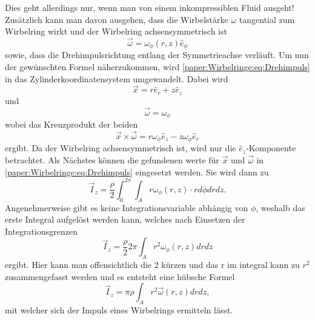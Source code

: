 Dies geht allerdings nur, wenn man von einem inkompressiblen Fluid ausgeht!
Zusätzlich kann man davon ausgehen, dass die Wirbelstärke $\omega$ tangential zum Wirbelring wirkt und der Wirbelring achsensymmetrisch ist
\begin{equation*}
    \vec{\omega}
    =
    \omega_\phi(r,z)\hat{e}_\phi
\end{equation*}
sowie, dass die Drehimpulsrichtung entlang der Symmetrieachse verläuft.
Um nun der gewünschten Formel näherzukommen, wird \ref{paper:Wirbelringe:eq:Drehimpuls} in das Zylinderkoordinatensystem umgewandelt.
Dabei wird
\begin{equation*}
    \vec{x}
    =
    r\hat{e}_r + z\hat{e}_z
\end{equation*}
und
\begin{equation*}
    \vec{\omega}
    =
    \omega_\phi
\end{equation*}
wobei das Kreuzprodukt der beiden 
\begin{equation*}
    \vec{x}\times\vec{\omega}
    =
    r\omega_\phi\hat{e}_z - z\omega_\phi\hat{e}_r
\end{equation*}
ergibt. Da der Wirbelring achsensymmetrisch ist, wird nur die $\hat{e}_z$-Komponente betrachtet.
Als Nächstes können die gefundenen werte für $\vec{x}$ und $\vec{\omega}$ in \ref{paper:Wirbelringe:eq:Drehimpuls} eingesetzt werden.
Sie wird dann zu
\begin{equation*}
    \vec{I}_z
    =
    \frac{\rho}{2}\int_{0}^{2\pi}\int_{A}r\omega_\phi(r,z)\cdot rd\phi drdz.
\end{equation*}
Angenehmerweise gibt es keine Integrationsvariable abhängig von $\phi$, weshalb das erste Integral aufgelöst werden kann, welches nach Einsetzen der Integrationsgrenzen
\begin{equation*}
    \vec{I}_z
    =
    \frac{\rho}{2}2\pi\int_{A}r^2\omega_\phi(r,z)drdz
\end{equation*}
ergibt. Hier kann man offensichtlich die 2 kürzen und das r im integral kann zu $r^2$ zusammengefasst werden und es entsteht eine hübsche Formel
\begin{equation}
    \vec{I}_z
    =
    \pi\rho\int_{A}r^2\vec{\omega}(r,z)drdz
    \label{paper:Wirbelringe:eq:achssymImp},
\end{equation}
mit welcher sich der Impuls eines Wirbelrings ermitteln lässt.

